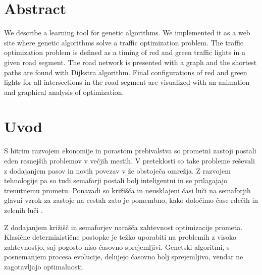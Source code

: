 \documentclass[a4paper, 12pt]{book}
\newcommand{\clearemptydoublepage}{\newpage{\pagestyle{empty}\cleardoublepage}}
\begin{document}
\clearemptydoublepage

\chapter*{Abstract}
We describe a learning tool for genetic algorithms. We implemented it as a web site where genetic algorithms solve a traffic optimization problem. The traffic optimization problem is defined as a timing of red and green traffic lights in a given road segment. The road network is presented with a graph and the shortest paths are found with Dijkstra algorithm. Final configurations of red and green lights for all intersections in the road segment are visualized with an animation and graphical analysis of optimization.

\clearemptydoublepage

\mainmatter
\setcounter{page}{1}
\pagestyle{fancy}

\chapter{Uvod}
\label{ch1}

S hitrim razvojem ekonomije in porastom prebivalstva so prometni zastoji postali eden resnej\v sih problemov v ve\v cjih mestih. V preteklosti so take probleme re\v sevali z dodajanjem pasov in novih povezav v \v ze obstoje\v ca omre\v zja. Z razvojem tehnologije pa so tudi semaforji postali bolj inteligentni in se prilagajajo trenutnemu prometu. 
Ponavadi so kri\v zi\v s\v ca  in neusklajeni \v casi lu\v ci na semaforjih glavni vzrok za zastoje na cestah zato je pomembno, kako dolo\v cimo \v case rde\v cih in zelenih lu\v ci \cite{he12-aes.pdf}.

Z dodajanjem kri\v zi\v s\v c in semaforjev nara\v s\v ca zahtevnost optimizacije prometa. Klasi\v cne deterministi\v cne postopke je te\v zko uporabiti na problemih z visoko zahtevnostjo, saj pogosto niso \v casovno sprejemljivi. Genetski algoritmi, s posnemanjem procesa evolucije, delujejo \v casovno bolj sprejemljivo, vendar ne zagotavljajo optimalnosti.
\end{document}
